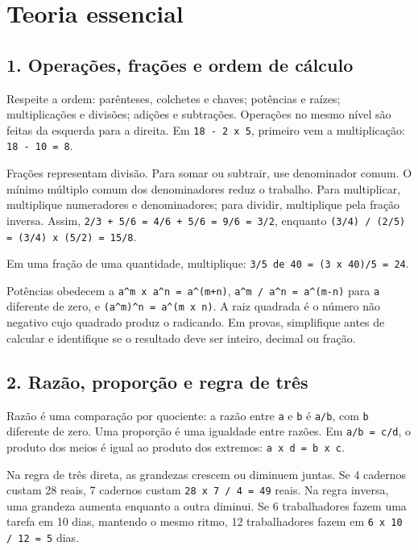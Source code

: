 \documentclass[11pt,a4paper]{article}
\begin{document}
\section*{Teoria essencial}

\subsection*{1. Operações, frações e ordem de cálculo}

Respeite a ordem: parênteses, colchetes e chaves; potências e raízes; multiplicações e divisões; adições e subtrações. Operações no mesmo nível são feitas da esquerda para a direita. Em \texttt{18 - 2 x 5}, primeiro vem a multiplicação: \texttt{18 - 10 = 8}.

Frações representam divisão. Para somar ou subtrair, use denominador comum. O mínimo múltiplo comum dos denominadores reduz o trabalho. Para multiplicar, multiplique numeradores e denominadores; para dividir, multiplique pela fração inversa. Assim, \texttt{2/3 + 5/6 = 4/6 + 5/6 = 9/6 = 3/2}, enquanto \texttt{(3/4) / (2/5) = (3/4) x (5/2) = 15/8}.

Em uma fração de uma quantidade, multiplique: \texttt{3/5 de 40 = (3 x 40)/5 = 24}.

Potências obedecem a \texttt{a\textasciicircum{}m x a\textasciicircum{}n = a\textasciicircum{}(m+n)}, \texttt{a\textasciicircum{}m / a\textasciicircum{}n = a\textasciicircum{}(m-n)} para \texttt{a} diferente de zero, e \texttt{(a\textasciicircum{}m)\textasciicircum{}n = a\textasciicircum{}(m x n)}. A raiz quadrada é o número não negativo cujo quadrado produz o radicando. Em provas, simplifique antes de calcular e identifique se o resultado deve ser inteiro, decimal ou fração.

\subsection*{2. Razão, proporção e regra de três}

Razão é uma comparação por quociente: a razão entre \texttt{a} e \texttt{b} é \texttt{a/b}, com \texttt{b} diferente de zero. Uma proporção é uma igualdade entre razões. Em \texttt{a/b = c/d}, o produto dos meios é igual ao produto dos extremos: \texttt{a x d = b x c}.

Na regra de três direta, as grandezas crescem ou diminuem juntas. Se 4 cadernos custam 28 reais, 7 cadernos custam \texttt{28 x 7 / 4 = 49} reais. Na regra inversa, uma grandeza aumenta enquanto a outra diminui. Se 6 trabalhadores fazem uma tarefa em 10 dias, mantendo o mesmo ritmo, 12 trabalhadores fazem em \texttt{6 x 10 / 12 = 5} dias.
\end{document}
